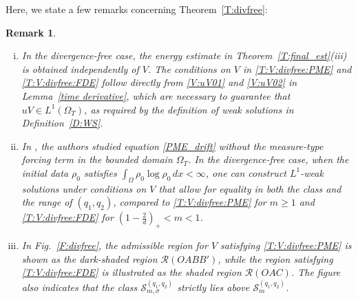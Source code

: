 \documentclass{amsart}
\newtheorem{remark}[defn]{Remark}
\numberwithin{equation}{section}
\begin{document}
Here, we state a few remarks concerning Theorem~\ref{T:divfree}:
\begin{remark}\label{R:T:divfree}
\begin{enumerate}[(i)]
	\item In the divergence-free case, the energy estimate in Theorem~\ref{T:final_est}(iii) is obtained independently of $V$. The conditions on $V$ in \eqref{T:V:divfree:PME} and \eqref{T:V:divfree:FDE} follow directly from \eqref{V:uV01} and \eqref{V:uV02} in Lemma~\ref{time derivative}, which are necessary to guarantee that $uV \in L^{1}(\Omega_T)$, as required by the definition of weak solutions in Definition~\ref{D:WS}.  
	
    \item In \cite{HKK02,HKK_FDE}, the authors studied equation \eqref{PME_drift} without the measure-type forcing term in the bounded domain $\Omega_{T}$. In the divergence-free case, when the initial data $\rho_0$ satisfies $\int_{\Omega} \rho_0 \log \rho_0 \,dx < \infty$, one can construct $L^1$-weak solutions under conditions on $V$ that allow for equality in both the class and the range of $(q_1, q_2)$, compared to \eqref{T:V:divfree:PME} for $m \ge 1$ and \eqref{T:V:divfree:FDE} for $(1-\frac{2}{d})_{+} < m < 1$.
	 
     \item In Fig.~\ref{F:divfree}, the admissible region for $V$ satisfying \eqref{T:V:divfree:PME} is shown as the dark-shaded region $\mathcal{R}(OABB')$, while the region satisfying \eqref{T:V:divfree:FDE} is illustrated as the shaded region $\mathcal{R}(OAC)$. The figure also indicates that the class $\mathcal{S}_{m,\sigma}^{(q_1,q_2)}$ strictly lies above $\mathcal{S}_{m}^{(q_1,q_2)}$.
         
\end{enumerate}
\end{remark}
\end{document}
